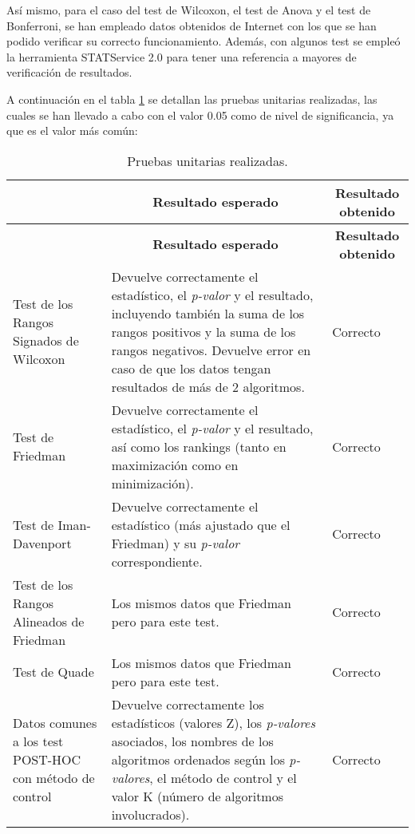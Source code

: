 Así mismo, para el caso del test de Wilcoxon, el test de Anova y el test de Bonferroni, se han empleado datos obtenidos de Internet con los que se han podido verificar su correcto funcionamiento. Además, con algunos test se empleó la herramienta STATService 2.0 \cite{statservice} para tener una referencia a mayores de verificación de resultados.

A continuación en el tabla \ref{unitarias} se detallan las pruebas unitarias realizadas, las cuales se han llevado a cabo con el valor 0.05 como de nivel de significancia, ya que es el valor más común:

\begin{center}
\setlength{\belowcaptionskip}{0.5cm}
\begin{longtable}[H]{| p{3cm}| p{7cm} | p{3cm} |}
	\hline
	\rowcolor{Gray}
	\multicolumn{1}{|c|}{\textbf{Test estadístico}} & \multicolumn{1}{|c|}{\textbf{Resultado esperado}} & \multicolumn{1}{|c|}{\textbf{Resultado obtenido}} \\ \hline
	\endfirsthead
	\hline
	\rowcolor{Gray}
	\multicolumn{1}{|c|}{\textbf{Test estadístico}} & \multicolumn{1}{|c|}{\textbf{Resultado esperado}} & \multicolumn{1}{|c|}{\textbf{Resultado obtenido}} \\ \hline
	\endhead
	\caption{Pruebas unitarias realizadas.}
	\label{unitarias}
	\endfoot
	Test de los Rangos Signados de Wilcoxon & Devuelve correctamente el estadístico, el \textit{p-valor} y el resultado, incluyendo también la suma de los rangos positivos y la suma de los rangos negativos. Devuelve error en caso de que los datos tengan resultados de más de 2 algoritmos. & Correcto \\ \hline
	Test de Friedman & Devuelve correctamente el estadístico, el \textit{p-valor} y el resultado, así como los rankings (tanto en maximización como en minimización). & Correcto \\ \hline
	Test de Iman-Davenport & Devuelve correctamente el estadístico (más ajustado que el Friedman) y su \textit{p-valor} correspondiente. & Correcto \\ \hline
	Test de los Rangos Alineados de Friedman & Los mismos datos que Friedman pero para este test. & Correcto \\ \hline
	Test de Quade & Los mismos datos que Friedman pero para este test. & Correcto \\ \hline
	Datos comunes a los test POST-HOC con método de control & Devuelve correctamente los estadísticos (valores Z), los \textit{p-valores} asociados, los nombres de los algoritmos ordenados según los \textit{p-valores}, el método de control y el valor K (número de algoritmos involucrados). & Correcto \\ \hline

\end{longtable}
\end{center}
